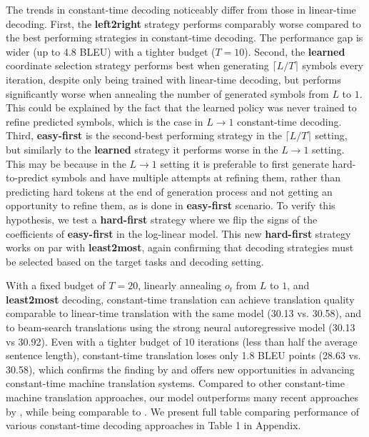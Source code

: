 \documentclass{article}
\begin{document}
The trends in constant-time decoding noticeably differ from those in linear-time decoding. First, the {\bf left2right} strategy performs comparably worse compared to the best performing strategies in constant-time decoding. The performance gap is wider (up to 4.8 BLEU) with a tighter budget ($T=10$). Second, the {\bf learned} coordinate selection strategy performs best when generating $\lceil L/T \rceil$ symbols every iteration, despite only being trained with linear-time decoding, but performs significantly worse when annealing the number of generated symbols from $L$ to $1$. This could be explained by the fact that the learned policy was never trained to refine predicted symbols, which is the case in $L \to 1$ constant-time decoding. Third, {\bf easy-first} is the second-best performing strategy in the $\lceil L/T \rceil$ setting, but similarly to the {\bf learned} strategy it performs worse in the $L \to 1$ setting. This may be because in the $L \to 1$ setting it is preferable to first generate hard-to-predict symbols and have multiple attempts at refining them, rather than predicting hard tokens at the end of generation process and not getting an opportunity to refine them, as is done in {\bf easy-first} scenario. To verify this hypothesis, we test a {\bf hard-first} strategy where we flip the signs of the coefficients of {\bf easy-first}  in the log-linear model. This new {\bf hard-first} strategy works on par with {\bf least2most}, again confirming that decoding strategies must be selected based on the target tasks and decoding setting. 

With a fixed budget of $T=20$, linearly annealing $o_t$ from $L$ to $1$, and {\bf least2most} decoding, constant-time translation can achieve translation quality comparable to linear-time translation with the same model (30.13 vs. 30.58), and to beam-search translations using the strong neural autoregressive model (30.13 vs 30.92).
Even with a tighter budget of $10$ iterations (less than half the average sentence length), constant-time translation loses only 1.8 BLEU points (28.63 vs. 30.58), which confirms the finding by \citet{ghazvininejad2019constant} and offers new opportunities in advancing constant-time machine translation systems. Compared to other constant-time machine translation approaches, our model outperforms many recent approaches by \citet{gu2018nonauto,lee2018deterministic,wang2019nonautoaux,ma2019flowseq}, while being comparable to \citet{ghazvininejad2019constant,shu2019lvnar}. We present full table comparing performance of various constant-time decoding approaches in Table 1 in Appendix.
\end{document}
